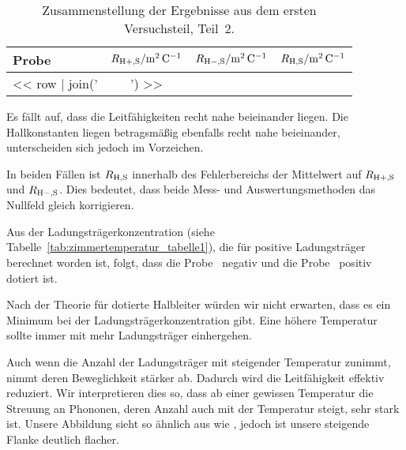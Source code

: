\begin{table}[htbp]
    \centering
    \begin{tabular}{lSSS}
        Probe &
        {$R_{\text H+, \text S} / \si{\meter\squared\per\coulomb}$} &
        {$R_{\text H-, \text S} / \si{\meter\squared\per\coulomb}$} &
        {$R_{\text H, \text S} / \si{\meter\squared\per\coulomb}$} \\
        \midrule
        << row | join(' & ') >> \\
    \end{tabular}
    \caption{%
        Zusammenstellung der Ergebnisse aus dem ersten Versuchsteil, Teil~2.
    }
    \label{tab:zimmertemperatur_tabelle2}
\end{table}

Es fällt auf, dass die Leitfähigkeiten recht nahe beieinander
liegen. Die Hallkonstanten liegen betragsmäßig ebenfalls recht nahe
beieinander, unterscheiden sich jedoch im Vorzeichen.

In beiden Fällen ist $R_{\text H, \text S}$ innerhalb des Fehlerbereichs der
Mittelwert auf $R_{\text H+, \text S}$ und $R_{\text H-, \text S}$. Dies
bedeutet, dass beide Mess- und Auswertungsmethoden das Nullfeld gleich
korrigieren.

Aus der Ladungsträgerkonzentration (siehe
Tabelle~\ref{tab:zimmertemperatur_tabelle1}), die für positive Ladungsträger
berechnet worden ist, folgt, dass die Probe~\probeA{} negativ und die
Probe~\probeB{} positiv dotiert ist.

Nach der Theorie für dotierte Halbleiter würden wir nicht erwarten, dass es
ein Minimum bei der Ladungsträgerkonzentration gibt. Eine höhere Temperatur
sollte immer mit mehr Ladungsträger einhergehen.

Auch wenn die Anzahl der Ladungsträger mit steigender Temperatur zunimmt,
nimmt deren Beweglichkeit stärker ab. Dadurch wird die Leitfähigkeit effektiv
reduziert. Wir interpretieren dies so, dass ab einer gewissen Temperatur die
Streuung an Phononen, deren Anzahl auch mit der Temperatur steigt, sehr stark
ist. Unsere Abbildung sieht so ähnlich aus wie
\cite[Abb.~3.3]{heldt/Diplomarbeit}, jedoch ist unsere steigende Flanke
deutlich flacher.

\printbibliography



